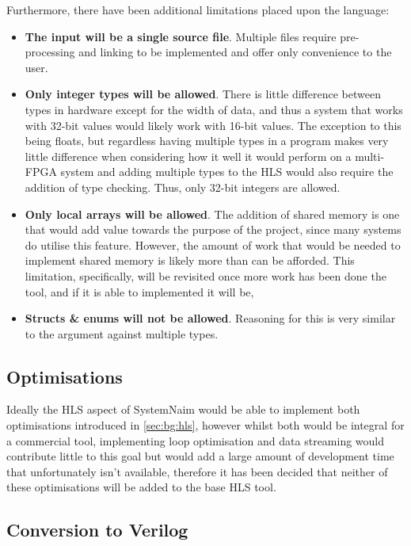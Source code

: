 Furthermore, there have been additional limitations placed upon the language:

\begin{itemize}
    \item \textbf{The input will be a single source file}. Multiple files require pre-processing and linking to be implemented and offer only convenience to the user.
    \item \textbf{Only integer types will be allowed}. There is little difference between types in hardware except for the width of data, and thus a system that works with 32-bit values would likely work with 16-bit values. The exception to this being floats, but regardless having multiple types in a program makes very little difference when considering how it well it would perform on a multi-FPGA system and adding multiple types to the HLS would also require the addition of type checking. Thus, only 32-bit integers are allowed.
    \item \textbf{Only local arrays will be allowed}. The addition of shared memory is one that would add value towards the purpose of the project, since many systems do utilise this feature. However, the amount of work that would be needed to implement shared memory is likely more than can be afforded. This limitation, specifically, will be revisited once more work has been done the tool, and if it is able to implemented it will be,
    \item \textbf{Structs \& enums will not be allowed}. Reasoning for this is very similar to the argument against multiple types.
\end{itemize}


\subsection{Optimisations}

Ideally the HLS aspect of SystemNaim would be able to implement both optimisations introduced in \autoref{sec:bg:hls}, however whilst both would be integral for a commercial tool, implementing loop optimisation and data streaming would contribute little to this goal but would add a large amount of development time that unfortunately isn't available, therefore it has been decided that neither of these optimisations will be added to the base HLS tool.

\subsection{Conversion to Verilog}

